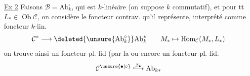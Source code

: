 \uline{Ex 2} Faisons $\mathcal B=\mathrm{Ab}_k^\circ$,
qui est $k$-linéaire (on suppose
$k$ commutatif), et pour tt $L_*\in\operatorname{Ob}\mathcal C$, on considère le foncteur contrav. qu'il représente, interprété
comme foncteur $k$-lin.
\[
 \mathcal C^\circ\longrightarrow\deleted{\unsure{\mathrm{Ab}^\circ_k}}\mathrm{Ab}_k^{*}
 \qquad M_*\mapsto\operatorname{Hom}_{\mathcal C}(M_*,L_*)
\]
on trouve ainsi un foncteur pl. fid (par la
ou encore un foncteur pl. fid.
\[
 \mathcal C^{\unsure{\bullet|\circ}}\lhook\joinrel\xrightarrow{\beta_{\bullet}}\mathrm{Ab}_{k*}
\]
